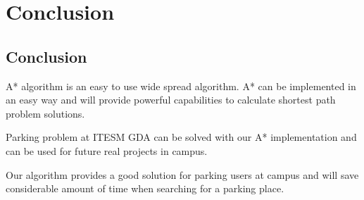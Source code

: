 \chapter{Conclusion}
\section{Conclusion}
A* algorithm is an easy to use wide spread algorithm. A* can be implemented in an easy way and will provide powerful capabilities to calculate shortest path problem solutions. 

Parking problem at ITESM GDA can be solved with our A* implementation and can be used for future real projects in campus. 

Our algorithm provides a good solution for parking users at campus and will save considerable amount of time when searching for a parking place. 
